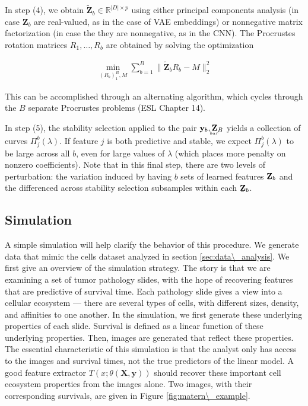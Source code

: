 In step (4), we obtain $\mathbf{\tilde{Z}}_{b} \in \mathbb{R}^{\left|D\right| \times p}$ using either principal components analysis (in case $\mathbf{Z}_{b}$ are real-valued, as in the case of VAE embeddings) or nonnegative matrix factorization (in case the they are nonnegative, as in the CNN). The Procrustes rotation matrices $R_{1}, \dots, R_{b}$ are obtained by solving the optimization

\begin{align}
\min_{\left(R_{b}\right)_{1}^{B}, M} \sum_{b = 1}^{B} \|\mathbf{\tilde{Z}}_{b}R_{b} - M\|_{2}^{2}
\end{align}

This can be accomplished through an alternating algorithm, which cycles through the $B$ separate Procrustes problems (ESL Chapter 14).

In step (5), the stability selection applied to the pair $\mathbf{y}_{b},
\underaccent{bar}{\mathbf{Z}}_{B}$ yields a collection of curves
$\Pi_{j}^{b}\left(\lambda\right)$. If feature $j$ is both predictive and stable,
we expect $\Pi_{j}^{b}\left(\lambda\right)$ to be large across all $b$, even for
large values of $\lambda$ (which places more penalty on nonzero coefficients).
Note that in this final step, there are two levels of perturbation: the
variation induced by having $b$ sets of learned features
$\underaccent{\bar}{\mathbf{Z}}_{b}$ and the differenced across stability selection
subsamples within each $\underaccent{\bar}{\mathbf{Z}}_{b}$.

\subsection{Simulation}

A simple simulation will help clarify the behavior of this procedure. We
generate data that mimic the cells dataset analyzed in section
\ref{sec:data\_analysis}. We first give an overview of the simulation strategy.
The story is that we are examining a set of tumor pathology slides, with the
hope of recovering features that are predictive of survival time. Each pathology
slide gives a view into a cellular ecosystem — there are several types of cells,
with different sizes, density, and affinities to one another. In the simulation,
we first generate these underlying properties of each slide. Survival is defined
as a linear function of these underlying properties. Then, images are generated
that reflect these properties. The essential characteristic of this simulation
is that the analyst only has access to the images and survival times, not the
true predictors of the linear model. A good feature extractor $T\left(x;
\theta\left(\mathbf{X}, \mathbf{y}\right)\right)$ should recover these important
cell ecosystem properties from the images alone. Two images, with their
corresponding survivals, are given in Figure \ref{fig:matern\_example}.

